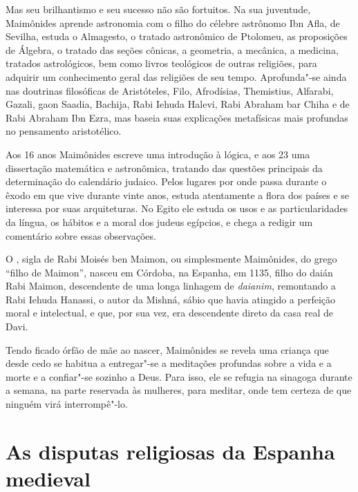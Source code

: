 Mas seu brilhantismo e seu sucesso não são fortuitos. Na sua juventude,
Maimônides aprende astronomia com o filho do célebre astrônomo Ibn
Afla, de Sevilha, estuda o Almagesto, o tratado astronômico de
Ptolomeu, as proposições de Álgebra, o tratado das seções cônicas, a
geometria, a mecânica, a medicina, tratados astrológicos, bem como
livros teológicos de outras religiões, para adquirir um conhecimento
geral das religiões de seu tempo. Aprofunda"-se ainda nas doutrinas
filosóficas de Aristóteles, Filo, Afrodísias, Themistius, Alfarabi, Gazali, 
gaon Saadia, Bachija, Rabi Iehuda Halevi, Rabi Abraham bar Chiha e de Rabi Abraham 
Ibn Ezra, mas baseia suas explicações metafísicas mais profundas no pensamento aristotélico.

Aos 16 anos Maimônides escreve uma introdução à lógica, e aos
23 uma dissertação matemática e astronômica, tratando das questões
principais da determinação do calendário judaico. Pelos lugares por onde
passa durante o êxodo em que vive durante vinte anos, estuda
atentamente a flora dos países e se interessa por suas arquiteturas. No
Egito ele estuda os usos e as particularidades da língua, os hábitos e
a moral dos judeus egípcios, e chega a redigir um comentário sobre essas
observações.

O , sigla de Rabi Moisés ben Maimon, ou simplesmente Maimônides,
do grego ``filho de Maimon'', nasceu em Córdoba, na Espanha, em 1135,
filho do daián Rabi Maimon, 
descendente de uma longa linhagem de \emph{daianim}, remontando a Rabi Iehuda 
Hanassi, o autor da Mishná, sábio que havia atingido a perfeição moral e
intelectual, e que, por sua vez, era descendente direto da casa real de
Davi.

Tendo ficado órfão de mãe ao nascer, Maimônides se revela uma criança que
desde cedo se habitua a entregar"-se a meditações profundas sobre a vida
e a morte e a confiar"-se sozinho a Deus. Para isso, ele se refugia na
sinagoga durante a semana, na parte reservada às mulheres, para meditar,
onde tem certeza de que ninguém virá interrompê"-lo.

\section{As disputas religiosas da Espanha medieval}

